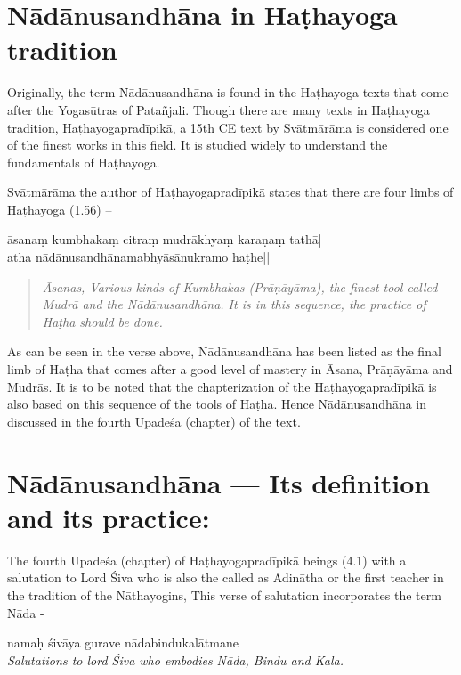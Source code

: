 \section*{Nādānusandhāna in Haṭhayoga tradition}

Originally, the term Nādānusandhāna is found in the Haṭhayoga texts that come after the Yogasūtras of Patañjali. Though there are many texts in Haṭhayoga tradition, Haṭhayogapradīpikā, a 15th CE text by Svātmārāma is considered one of the finest works in this field. It is studied widely to understand the fundamentals of Haṭhayoga.

Svātmārāma the author of Haṭhayogapradīpikā states that there are four limbs of Haṭhayoga (1.56) –

\begin{shloka}
āsanaṃ kumbhakaṃ citraṃ mudrākhyaṃ karaṇaṃ tathā|\\
atha nādānusandhānamabhyāsānukramo haṭhe||
\end{shloka}

\begin{quote}
\textit{Āsanas, Various kinds of Kumbhakas (Prāṇāyāma), the finest tool called Mudrā and the Nādānusandhāna. It is in this sequence, the practice of Haṭha should be done.}
\end{quote}

As can be seen in the verse above, Nādānusandhāna has been listed as the final limb of Haṭha that comes after a good level of mastery in Āsana, Prāṇāyāma and Mudrās. It is to be noted that the chapterization of the Haṭhayogapradīpikā is also based on this sequence of the tools of Haṭha. Hence Nādānusandhāna in discussed in the fourth Upadeśa (chapter) of the text.   

\section*{Nādānusandhāna ---  Its definition and its practice:}

The fourth Upadeśa (chapter) of Haṭhayogapradīpikā beings (4.1) with a salutation to Lord Śiva who is also the called as Ādinātha or the first teacher in the tradition of the Nāthayogins, This verse of salutation incorporates the term Nāda - 

\begin{center}
namaḥ śivāya gurave nādabindukalātmane\\
\textit{Salutations to lord Śiva who embodies Nāda, Bindu and Kala.}
\end{center}

